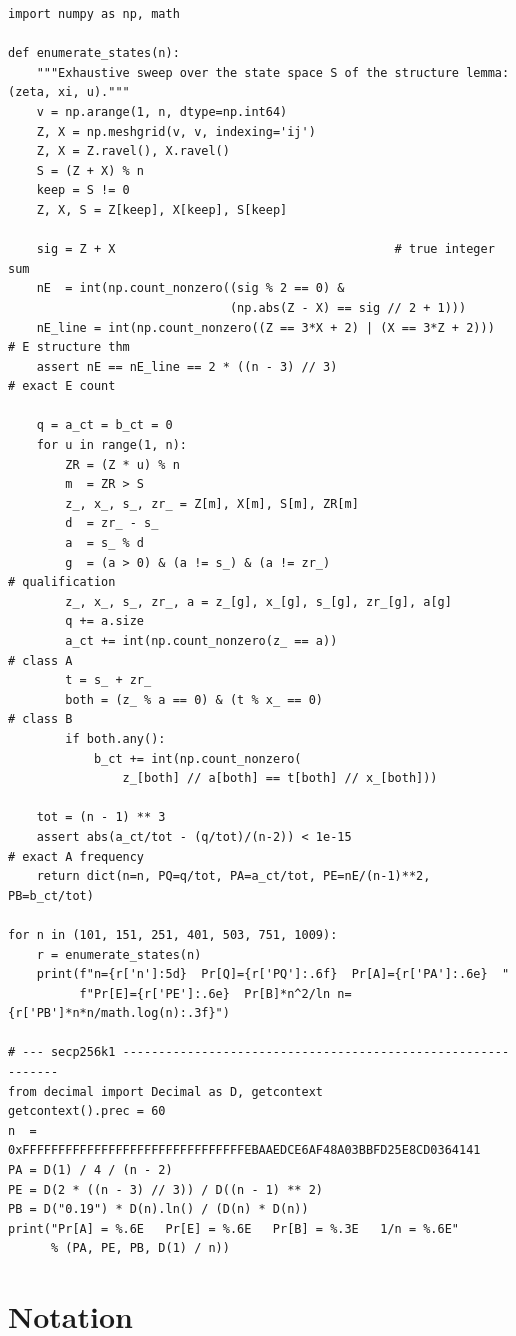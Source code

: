 \documentclass[11pt,a4paper]{article}
\theoremstyle{plain}
\theoremstyle{definition}
\theoremstyle{remark}
\begin{document}
\begin{lstlisting}
import numpy as np, math

def enumerate_states(n):
    """Exhaustive sweep over the state space S of the structure lemma: (zeta, xi, u)."""
    v = np.arange(1, n, dtype=np.int64)
    Z, X = np.meshgrid(v, v, indexing='ij')
    Z, X = Z.ravel(), X.ravel()
    S = (Z + X) % n
    keep = S != 0
    Z, X, S = Z[keep], X[keep], S[keep]

    sig = Z + X                                       # true integer sum
    nE  = int(np.count_nonzero((sig % 2 == 0) &
                               (np.abs(Z - X) == sig // 2 + 1)))
    nE_line = int(np.count_nonzero((Z == 3*X + 2) | (X == 3*Z + 2)))  # E structure thm
    assert nE == nE_line == 2 * ((n - 3) // 3)                        # exact E count

    q = a_ct = b_ct = 0
    for u in range(1, n):
        ZR = (Z * u) % n
        m  = ZR > S
        z_, x_, s_, zr_ = Z[m], X[m], S[m], ZR[m]
        d  = zr_ - s_
        a  = s_ % d
        g  = (a > 0) & (a != s_) & (a != zr_)                         # qualification
        z_, x_, s_, zr_, a = z_[g], x_[g], s_[g], zr_[g], a[g]
        q += a.size
        a_ct += int(np.count_nonzero(z_ == a))                        # class A
        t = s_ + zr_
        both = (z_ % a == 0) & (t % x_ == 0)                          # class B
        if both.any():
            b_ct += int(np.count_nonzero(
                z_[both] // a[both] == t[both] // x_[both]))

    tot = (n - 1) ** 3
    assert abs(a_ct/tot - (q/tot)/(n-2)) < 1e-15                      # exact A frequency
    return dict(n=n, PQ=q/tot, PA=a_ct/tot, PE=nE/(n-1)**2, PB=b_ct/tot)

for n in (101, 151, 251, 401, 503, 751, 1009):
    r = enumerate_states(n)
    print(f"n={r['n']:5d}  Pr[Q]={r['PQ']:.6f}  Pr[A]={r['PA']:.6e}  "
          f"Pr[E]={r['PE']:.6e}  Pr[B]*n^2/ln n={r['PB']*n*n/math.log(n):.3f}")

# --- secp256k1 -------------------------------------------------------------
from decimal import Decimal as D, getcontext
getcontext().prec = 60
n  = 0xFFFFFFFFFFFFFFFFFFFFFFFFFFFFFFFEBAAEDCE6AF48A03BBFD25E8CD0364141
PA = D(1) / 4 / (n - 2)
PE = D(2 * ((n - 3) // 3)) / D((n - 1) ** 2)
PB = D("0.19") * D(n).ln() / (D(n) * D(n))
print("Pr[A] = %.6E   Pr[E] = %.6E   Pr[B] = %.3E   1/n = %.6E"
      % (PA, PE, PB, D(1) / n))
\end{lstlisting}

\section{Notation}\label{app:notation}
\end{document}
